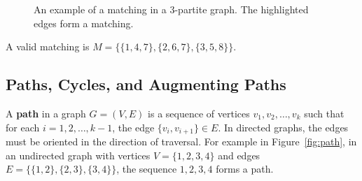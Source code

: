 \begin{figure}[h]
\begin{center}
\caption{An example of a matching in a 3-partite graph. The highlighted edges form a matching.}
\label{fig:matching_d3}
\end{center}
\end{figure}

A valid matching is \( M = \{\{1, 4, 7\}, \{2, 6, 7\}, \{3, 5, 8\}\} \).

\subsection{Paths, Cycles, and Augmenting Paths}

A \textbf{path} in a graph \( G = (V, E) \) is a sequence of vertices \( v_1, v_2, \dots, v_k \) such that for each \( i = 1, 2, \dots, k-1 \), the edge \( \{v_i, v_{i+1}\} \in E \). In directed graphs, the edges must be oriented in the direction of traversal. For example in Figure~\ref{fig:path}, in an undirected graph with vertices \( V = \{1, 2, 3, 4\} \) and edges \( E = \{\{1, 2\}, \{2, 3\}, \{3, 4\}\} \), the sequence \( 1, 2, 3, 4 \) forms a path. \cite{yadav2023advanced, cormen2009introduction}


